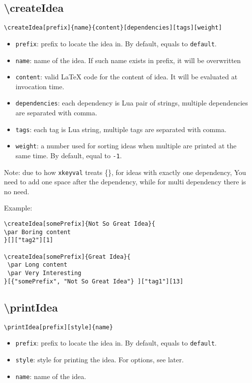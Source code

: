 \documentclass[11pt]{article}
\begin{document}
\subsection{\textbackslash{}createIdea}
\begin{verbatim}
\createIdea[prefix]{name}{content}[dependencies][tags][weight]
\end{verbatim}
\begin{itemize}
\item \texttt{prefix}: prefix to locate the idea in. By default, equals to \texttt{default}.
\item \texttt{name}: name of the idea. If such name exists in prefix, it will be overwritten
\item \texttt{content}: valid LaTeX code for the content of idea. It will be evaluated at invocation time.
\item \texttt{dependencies}: each dependency is Lua pair of strings, multiple dependencies are separated with comma.
\item \texttt{tags}: each tag is Lua string, multiple tags are separated with comma.
\item \texttt{weight}: a number used for sorting ideas when multiple are printed at the same time. By default, equal to \texttt{-1}.
\end{itemize}
\par Note: due to how \texttt{xkeyval} treats \{\}, for ideas with exactly one dependency, You need to add one space after the dependency, while for multi dependency there is no need.
\par Example:
\begin{verbatim}
\createIdea[somePrefix]{Not So Great Idea}{
\par Boring content
}[]["tag2"][1]

\createIdea[somePrefix]{Great Idea}{
 \par Long content
 \par Very Interesting
}[{"somePrefix", "Not So Great Idea"} ]["tag1"][13]
\end{verbatim}

\subsection{\textbackslash{}printIdea}
\begin{verbatim}
\printIdea[prefix][style]{name}
\end{verbatim}

\begin{itemize}
\item \texttt{prefix}: prefix to locate the idea in. By default, equals to \texttt{default}.
\item \texttt{style}: style for printing the idea. For options, see later.
\item \texttt{name}: name of the idea.
\end{itemize}
\end{document}

